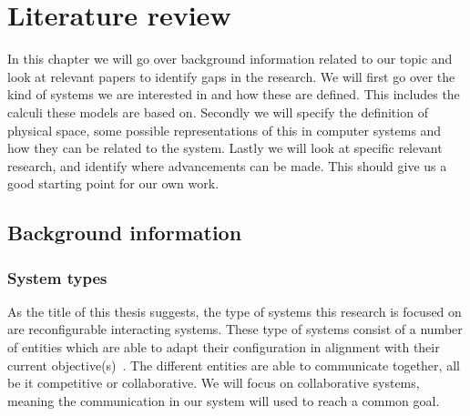 \chapter{Literature review}
In this chapter we will go over background information related to our topic and look at relevant papers to identify gaps in the research. We will first go over the kind of systems we are interested in and how these are defined. This includes the calculi these models are based on. Secondly we will specify the definition of physical space, some possible representations of this in computer systems and how they can be related to the system. Lastly we will look at specific relevant research, and identify where advancements can be made. This should give us a good starting point for our own work.

\section{Background information}
\subsection{System types}
As the title of this thesis suggests, the type of systems this research is focused on are reconfigurable interacting systems. These type of systems consist of a number of entities which are able to adapt their configuration in alignment with their current objective(s)~\cite{abd2022model}. The different entities are able to communicate together, all be it competitive or collaborative. We will focus on collaborative systems, meaning the communication in our system will used to reach a common goal.
\\

